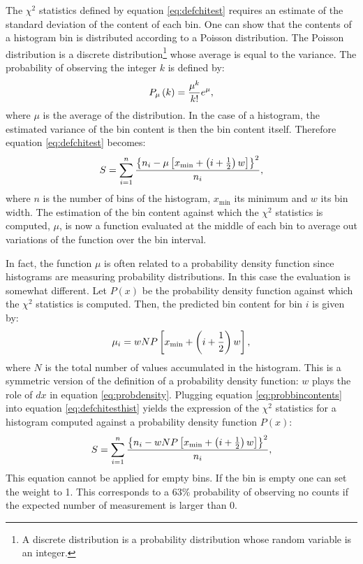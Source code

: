 \documentclass[twoside]{book}
\begin{document}
The $\chi^2$ statistics defined by equation \ref{eq:defchitest}
requires an estimate of the standard deviation of the content of
each bin. One can show that the contents of a histogram bin is
distributed according to a Poisson distribution. The Poisson
distribution is a discrete distribution\footnote{A discrete
distribution is a probability distribution whose random variable
is an integer.} whose average is equal to the variance. The
probability of observing the integer $k$ is defined by:
\begin{equation}
 P_{\mu}\left(k\right)= {\mu^k\over k!}e^{\mu},
\end{equation}
where $\mu$ is the average of the distribution. In the case of a
histogram, the estimated variance of the bin content is then the
bin content itself. Therefore equation \ref{eq:defchitest}
becomes:
\begin{equation}
\label{eq:defchitesthist}
  S=\sum_{i=1}^n
  { \left\{n_i - \mu\left[x_{\min} + \left(i+{1\over 2} \right)w\right]\right\}^2 \over
  n_i},
\end{equation}
where $n$ is the number of bins of the histogram, $x_{\min}$ its
minimum and $w$ its bin width. The estimation of the bin content
against which the $\chi^2$ statistics is computed, $\mu$, is now a
function evaluated at the middle of each bin to average out
variations of the function over the bin interval.

In fact, the function $\mu$ is often related to a probability
density function since histograms are measuring probability
distributions. In this case the evaluation is somewhat different.
Let $P\left(x\right)$ be the probability density function against
which the $\chi^2$ statistics is computed. Then, the predicted bin
content for bin $i$ is given by:
\begin{equation}
\label{eq:probbincontents}
 \mu_i = wNP\left[x_{\min} + \left(i+{1\over 2} \right)w\right],
\end{equation}
where $N$ is the total number of values accumulated in the
histogram. This is a symmetric version of the definition of a
probability density function: $w$ plays the role of $dx$ in
equation \ref{eq:probdensity}. Plugging equation
\ref{eq:probbincontents} into equation \ref{eq:defchitesthist}
yields the expression of the $\chi^2$ statistics for a histogram
computed against a probability density function $P\left(x\right)$:
\begin{equation}
\label{eq:defchitesthistprob}
  S=\sum_{i=1}^n
  { \left\{n_i - wNP\left[x_{\min} + \left(i+{1\over 2} \right)w\right]\right\}^2 \over
  n_i},
\end{equation}
This equation cannot be applied for empty bins. If the bin is
empty one can set the weight to 1. This corresponds to a $63\%$
probability of observing no counts if the expected number of
measurement is larger than 0.
\end{document}
